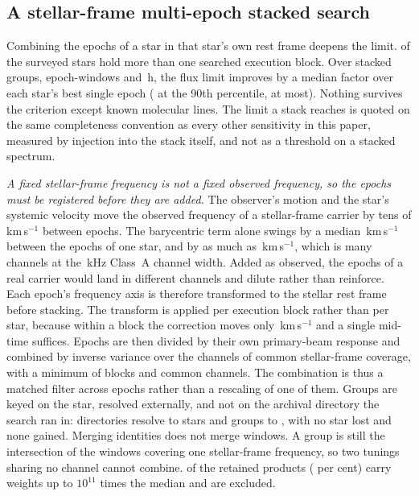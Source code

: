 \subsection{A stellar-frame multi-epoch stacked search}
\label{sec:stack}

Combining the epochs of a star in that star's own rest frame deepens the
limit. \StkNStar{} of the surveyed stars hold more than one searched
execution block. Over \StkNGroup{} stacked groups, \StkNEpochComb{}
epoch-windows and \StkHours\,h, the flux limit improves by a median factor
\StkLimitGainMed{} over each star's best single epoch
(\StkLimitGainPNinety{} at the 90th percentile, \StkLimitGainMax{} at most).
Nothing survives the criterion except \StkNSurvive{} known molecular lines.
The limit a stack reaches is quoted on the same completeness convention as
every other sensitivity in this paper, measured by injection into the stack
itself, and not as a threshold on a stacked spectrum.

\emph{A fixed stellar-frame frequency is not a fixed observed frequency, so
the epochs must be registered before they are added.} The observer's motion
and the star's systemic velocity move the observed frequency of a
stellar-frame carrier by tens of km\,s$^{-1}$ between epochs. The
barycentric term alone swings by a median \StkVcorrSwingMed\,km\,s$^{-1}$
between the epochs of one star, and by as much as
\StkVcorrSwingMax\,km\,s$^{-1}$, which is many channels at the
\StkRefChanKHz\,kHz Class~A channel width. Added as observed, the epochs of
a real carrier would land in different channels and dilute rather than
reinforce. Each epoch's frequency axis is therefore transformed to the
stellar rest frame before stacking. The transform is applied per execution
block rather than per star, because within a block the correction moves only
\StkIntraBlockKms\,km\,s$^{-1}$ and a single mid-time suffices. Epochs are
then divided by their own primary-beam response and combined by inverse
variance over the channels of common stellar-frame coverage, with a minimum
of \StkMinBlocks{} blocks and \StkMinChan{} common channels. The combination
is thus a matched filter across epochs rather than a rescaling of one of
them. Groups are keyed on the star, resolved externally, and not on the
archival directory the search ran in: \StkNStarPre{} directories resolve to
\StkNStar{} stars and \StkNGroupPre{} groups to \StkNGroup, with no star lost
and none gained. Merging identities does not merge windows. A group is still
the intersection of the windows covering one stellar-frame frequency, so two
tunings sharing no channel cannot combine. \StkBadWeight{} of the
\StkNProd{} retained products (\StkBadWeightPct{} per cent) carry weights up
to $10^{11}$ times the median and are excluded.

